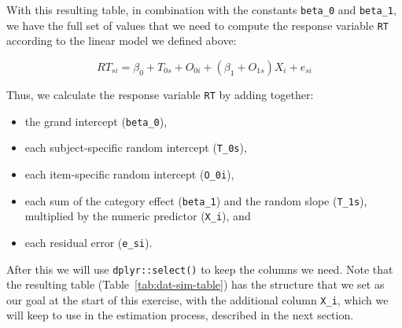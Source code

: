 \documentclass[
  english,
  doc,floatsintext]{apa6}
\newenvironment{Shaded}{\begin{snugshade}}{\end{snugshade}}
\newcommand{\CommentTok}[1]{\textcolor[rgb]{0.56,0.35,0.01}{\textit{#1}}}
\newcommand{\DataTypeTok}[1]{\textcolor[rgb]{0.13,0.29,0.53}{#1}}
\newcommand{\DecValTok}[1]{\textcolor[rgb]{0.00,0.00,0.81}{#1}}
\newcommand{\KeywordTok}[1]{\textcolor[rgb]{0.13,0.29,0.53}{\textbf{#1}}}
\newcommand{\NormalTok}[1]{#1}
\newcommand{\OperatorTok}[1]{\textcolor[rgb]{0.81,0.36,0.00}{\textbf{#1}}}
\newcommand{\StringTok}[1]{\textcolor[rgb]{0.31,0.60,0.02}{#1}}
\providecommand{\tightlist}{%
  \setlength{\itemsep}{0pt}\setlength{\parskip}{0pt}}
\begin{document}
With this resulting table, in combination with the constants \texttt{beta\_0} and \texttt{beta\_1}, we have the full set of values that we need to compute the response variable \texttt{RT} according to the linear model we defined above:

\begin{equation}
RT_{si} = \beta_0 + T_{0s} + O_{0i} + \left(\beta_1 + O_{1s}\right) X_i + e_{si}
\end{equation}

\noindent Thus, we calculate the response variable \texttt{RT} by adding together:

\begin{itemize}
\tightlist
\item
  the grand intercept (\texttt{beta\_0}),
\item
  each subject-specific random intercept (\texttt{T\_0s}),
\item
  each item-specific random intercept (\texttt{O\_0i}),
\item
  each sum of the category effect (\texttt{beta\_1}) and the random slope (\texttt{T\_1s}), multiplied by the numeric predictor (\texttt{X\_i}), and
\item
  each residual error (\texttt{e\_si}).
\end{itemize}

\noindent After this we will use \texttt{dplyr::select()} to keep the columns we need. Note that the resulting table (Table~\ref{tab:dat-sim-table}) has the structure that we set as our goal at the start of this exercise, with the additional column \texttt{X\_i}, which we will keep to use in the estimation process, described in the next section.

\begin{Shaded}
\end{Shaded}
\end{document}
